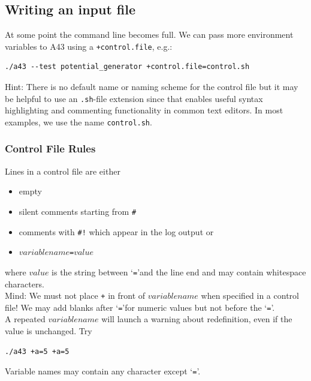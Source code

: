 \documentclass[oribibl]{llncs}
\newcommand{\ttt}[1]{\texttt{#1}}
\newcommand{\codename}{A43}
\begin{document}
%
\subsection{Writing an input file} \label{sec:control-file}
%
At some point the command line becomes full.
We can pass more environment variables to \codename{} using a \ttt{+control.file}, e.g.:
\begin{verbatim}
./a43 --test potential_generator +control.file=control.sh
\end{verbatim}
Hint: There is no default name or naming scheme for the control file 
but it may be helpful to use an \ttt{.sh}-file extension since that
enables useful syntax highlighting and commenting functionality in common text editors.
In most examples, we use the name \ttt{control.sh}.
%
%

\subsubsection{Control File Rules} \label{sec:control-file-rules}
%
Lines in a control file are either 
\begin{itemize}
    \item empty
    \item silent comments starting from \ttt{\#}
    \item comments with \ttt{\#!} which appear in the log output or
    \item $variablename$\ttt{=}$value$
\end{itemize}
where $value$ is the string between \lq\ttt{=}\rq and the line end and may contain whitespace characters.
\\
Mind: We must not place \ttt{+} in front of $variablename$ when specified in a control file!
We may add blanks after \lq\ttt{=}\rq for numeric values but not before the \lq\ttt{=}\rq.
\\
A repeated $variablename$ will launch a warning about redefinition, even if the value is unchanged. Try
\begin{verbatim}
./a43 +a=5 +a=5
\end{verbatim}
Variable names may contain any character except \lq\ttt{=}\rq.
\end{document}
